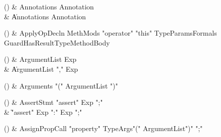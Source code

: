 \begin{bbgrammarappendix}{3.9in}

() & Annotations \label{prod:Annotations}  \: Annotation  \\

 &    \| Annotations Annotation \\

\end{bbgrammarappendix}

\begin{bbgrammarappendix}{3.8in}

() & ApplyOpDecln \label{prod:ApplyOpDecln}  \: MethMods \xcd"operator" \xcd"this" TypeParams\opt Formals Guard\opt HasResultType\opt MethodBody  \\


\end{bbgrammarappendix}

\begin{bbgrammarappendix}{3.8in}

() & ArgumentList \label{prod:ArgumentList}  \: Exp  \\

 &    \| ArgumentList \xcd"," Exp \\

\end{bbgrammarappendix}

\begin{bbgrammarappendix}{4.1in}

() & Arguments \label{prod:Arguments}  \: \xcd"(" ArgumentList \xcd")"  \\


\end{bbgrammarappendix}

\begin{bbgrammarappendix}{4.0in}

() & AssertStmt \label{prod:AssertStmt}  \: \xcd"assert" Exp \xcd";"  \\

 &    \| \xcd"assert" Exp  \xcd":" Exp  \xcd";" \\

\end{bbgrammarappendix}

\begin{bbgrammarappendix}{3.6in}

() & AssignPropCall \label{prod:AssignPropCall}  \: \xcd"property" TypeArgs\opt \xcd"(" ArgumentList\opt \xcd")" \xcd";"  \\


\end{bbgrammarappendix}

